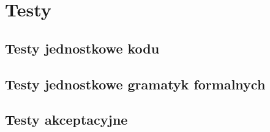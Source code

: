 \chapter{Testy}
\section{Testy jednostkowe kodu}
\section{Testy jednostkowe gramatyk formalnych}
\section{Testy akceptacyjne}
